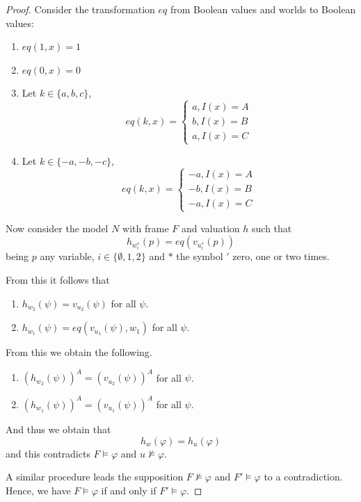 \documentclass{amsart}
\begin{document}
\begin{proof}
    Consider the transformation $eq$ from Boolean values and worlds to Boolean values:
    \begin{enumerate}
        \item $eq(1, x) = 1$
        \item $eq(0, x) = 0$
        \item Let $k \in \{a, b, c\}$, 
        $$eq(k, x) = \begin{cases}
            a, I(x) = A\\
            b, I(x) = B\\
            a, I(x) = C
        \end{cases}$$
        \item Let $k \in \{-a, -b, -c\}$, 
        $$eq(k, x) = \begin{cases}
            -a, I(x) = A\\
            -b, I(x) = B\\
            -a, I(x) = C
        \end{cases}$$
    \end{enumerate}

    Now consider the model $N$ with frame $F$ and valuation $h$ such that 
        $$h_{w_i^*}(p) = eq(v_{u_i^*}(p))$$
    being $p$ any variable, $i \in \{\emptyset, 1, 2\}$ and $*$ the symbol $'$ zero, one or two times.

    From this it follows that 
    \begin{enumerate}
        \item $h_{w_2}(\psi) = v_{u_2}(\psi)$ for all $\psi$.
        \item $h_{w_1}(\psi) = eq(v_{u_1}(\psi), w_1)$ for all $\psi$.
    \end{enumerate}

    From this we obtain the following. 
    \begin{enumerate}
        \item $(h_{w_2}(\psi))^A = (v_{u_2}(\psi))^A$ for all $\psi$.
        \item $(h_{w_1}(\psi))^A = (v_{u_1}(\psi))^A$ for all $\psi$.
    \end{enumerate}
    And thus we obtain that 
    $$h_w(\varphi) = h_u(\varphi)$$
    and this contradicts $F \vDash \varphi$ and $u \nvDash \varphi$.

    A similar procedure leads the supposition $F \nvDash \varphi$ and $F' \vDash \varphi$ to a contradiction. Hence, we have $F \vDash \varphi$ if and only if $F' \vDash \varphi$.
\end{proof}
\end{document}
